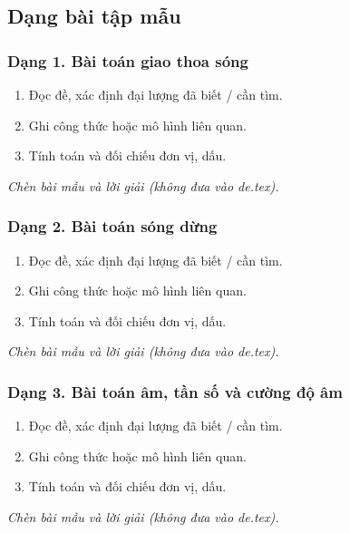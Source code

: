 

\subsection{Dạng bài tập mẫu}
\subsubsection{Dạng 1. Bài toán giao thoa sóng}
\begin{phuongphap}
\begin{enumerate}
\item Đọc đề, xác định đại lượng đã biết / cần tìm.
\item Ghi công thức hoặc mô hình liên quan.
\item Tính toán và đối chiếu đơn vị, dấu.
\end{enumerate}
\end{phuongphap}
\begin{vidumau}
\textit{Chèn bài mẫu và lời giải (không đưa vào de.tex).}
\end{vidumau}

\subsubsection{Dạng 2. Bài toán sóng dừng}
\begin{phuongphap}
\begin{enumerate}
\item Đọc đề, xác định đại lượng đã biết / cần tìm.
\item Ghi công thức hoặc mô hình liên quan.
\item Tính toán và đối chiếu đơn vị, dấu.
\end{enumerate}
\end{phuongphap}
\begin{vidumau}
\textit{Chèn bài mẫu và lời giải (không đưa vào de.tex).}
\end{vidumau}

\subsubsection{Dạng 3. Bài toán âm, tần số và cường độ âm}
\begin{phuongphap}
\begin{enumerate}
\item Đọc đề, xác định đại lượng đã biết / cần tìm.
\item Ghi công thức hoặc mô hình liên quan.
\item Tính toán và đối chiếu đơn vị, dấu.
\end{enumerate}
\end{phuongphap}
\begin{vidumau}
\textit{Chèn bài mẫu và lời giải (không đưa vào de.tex).}
\end{vidumau}


